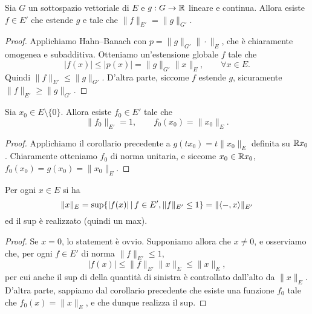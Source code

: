 \begin{corollary}
\label{cor:hahn_banach_ext}
	Sia $G$ un sottospazio vettoriale di $E$ e $g : G \to \mathbb{R}$ lineare e continua.
	Allora esiste $f \in E'$ che estende $g$ e tale che $\|f\|_{E'} = \|g\|_{G'}$.
\end{corollary}
\begin{proof}
	Applichiamo Hahn--Banach con $p = \|g\|_{G'} \|\cdot\|_E$, che è chiaramente omogenea e subadditiva. Otteniamo un'estensione globale $f$ tale che
	\begin{equation*}
		|f(x)| \leq |p(x)| = \|g\|_{G'}\|x\|_E, \qquad \forall x \in E.
	\end{equation*}
	Quindi $\|f\|_{E'} \leq \|g\|_{G'}$.
	D'altra parte, siccome $f$ estende $g$, sicuramente $\|f\|_{E'} \geq \|g\|_{G'}$.
\end{proof}

\begin{corollary}
\label{cor:two_chap_1}
	Sia $x_0 \in E \setminus\{0\}$.
	Allora esiste $f_0 \in E'$ tale che
	\begin{equation*}
		\|f_0\|_{E'} = 1, \qquad f_0(x_0) = \|x_0\|_E.
	\end{equation*}
\end{corollary}
\begin{proof}
	Applichiamo il corollario precedente a $g(tx_0) = t\|x_0\|_E$ definita su $\mathbb{R} x_0$. Chiaramente otteniamo $f_0$ di norma unitaria, e siccome $x_0 \in \mathbb{R} x_0$, $f_0(x_0) = g(x_0) = \|x_0\|_E$.
\end{proof}

\begin{corollary}
\label{cor:eval_norm}
	Per ogni $x \in E$ si ha
	\begin{equation*}
		\|x\|_E = \sup \{ |f(x)| \,|\, f \in E', \|f\|_{E'} \leq 1\} = \|\langle -, x \rangle\|_{E'}
	\end{equation*}
	ed il sup è realizzato (quindi un max).
\end{corollary}
\begin{proof}
	Se $x=0$, lo statement è ovvio. Supponiamo allora che $x \neq 0$, e osserviamo che, per ogni $f \in E'$ di norma $\|f\|_{E'} \leq 1$,
	\begin{equation*}
		|f(x)| \leq \|f\|_{E'}\|x\|_E \leq \|x\|_E,
	\end{equation*}
	per cui anche il sup di della quantità di sinistra è controllato dall'alto da $\|x\|_E$. D'altra parte, sappiamo dal corollario precedente che esiste una funzione $f_0$ tale che $f_0(x) = \|x\|_E$, e che dunque realizza il sup.
\end{proof}


